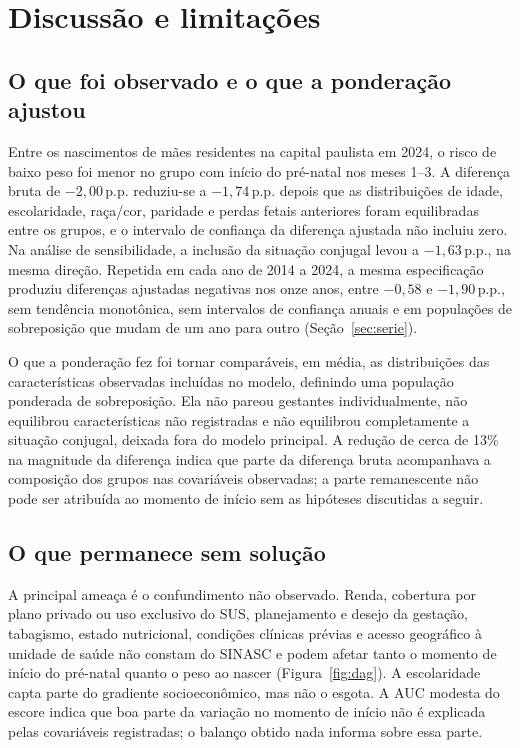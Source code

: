 \documentclass[11pt,a4paper]{article}
\newcommand{\pp}{\,p.p.}
\begin{document}
\section{Discussão e limitações}\label{sec:discussao}

\subsection{O que foi observado e o que a ponderação ajustou}

Entre os nascimentos de mães residentes na capital paulista em 2024, o risco de baixo peso
foi menor no grupo com início do pré-natal nos meses 1--3. A diferença bruta de
$-2{,}00$\pp{} reduziu-se a $-1{,}74$\pp{} depois que as distribuições de idade,
escolaridade, raça/cor, paridade e perdas fetais anteriores foram equilibradas entre os
grupos, e o intervalo de confiança da diferença ajustada não incluiu zero. Na análise de
sensibilidade, a inclusão da situação conjugal levou a $-1{,}63$\pp, na mesma direção.
Repetida em cada ano de 2014 a 2024, a mesma especificação produziu diferenças ajustadas
negativas nos onze anos, entre $-0{,}58$ e $-1{,}90$\pp, sem tendência monotônica, sem
intervalos de confiança anuais e em populações de sobreposição que mudam de um ano para
outro (Seção~\ref{sec:serie}).

O que a ponderação fez foi tornar comparáveis, em média, as distribuições das
características observadas incluídas no modelo, definindo uma população ponderada de
sobreposição. Ela não pareou gestantes individualmente, não equilibrou características não
registradas e não equilibrou completamente a situação conjugal, deixada fora do modelo
principal. A redução de cerca de 13\% na magnitude da diferença indica que parte da
diferença bruta acompanhava a composição dos grupos nas covariáveis observadas; a parte
remanescente não pode ser atribuída ao momento de início sem as hipóteses discutidas a
seguir.

\subsection{O que permanece sem solução}

A principal ameaça é o confundimento não observado. Renda, cobertura por plano privado ou
uso exclusivo do SUS, planejamento e desejo da gestação, tabagismo, estado nutricional,
condições clínicas prévias e acesso geográfico à unidade de saúde não constam do SINASC e
podem afetar tanto o momento de início do pré-natal quanto o peso ao nascer
(Figura~\ref{fig:dag}). A escolaridade capta parte do gradiente socioeconômico, mas não o
esgota. A AUC modesta do escore indica que boa parte da variação no momento de início não
é explicada pelas covariáveis registradas; o balanço obtido nada informa sobre essa parte.
\end{document}
